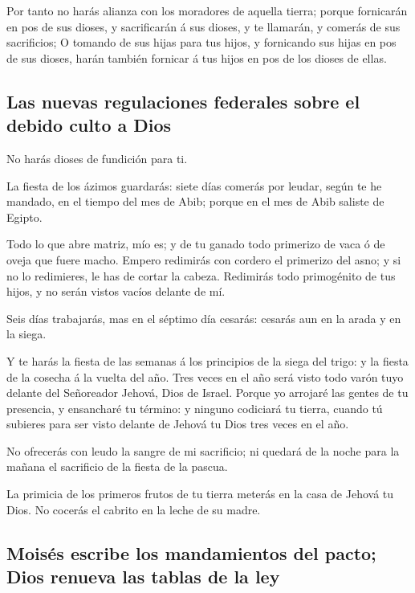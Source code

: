  Por tanto no harás alianza con los moradores de aquella
tierra; porque fornicarán en pos de sus dioses, y sacrificarán á sus
dioses, y te llamarán, y comerás de sus sacrificios;  O
tomando de sus hijas para tus hijos, y fornicando sus hijas en pos de
sus dioses, harán también fornicar á tus hijos en pos de los dioses de
ellas.

\hypertarget{las-nuevas-regulaciones-federales-sobre-el-debido-culto-a-dios}{%
\subsection{Las nuevas regulaciones federales sobre el debido culto a
Dios}\label{las-nuevas-regulaciones-federales-sobre-el-debido-culto-a-dios}}

 No harás dioses de fundición para ti.

 La fiesta de los ázimos guardarás: siete días comerás
por leudar, según te he mandado, en el tiempo del mes de Abib; porque en
el mes de Abib saliste de Egipto.

 Todo lo que abre matriz, mío es; y de tu ganado todo
primerizo de vaca ó de oveja que fuere macho.  Empero
redimirás con cordero el primerizo del asno; y si no lo redimieres, le
has de cortar la cabeza. Redimirás todo primogénito de tus hijos, y no
serán vistos vacíos delante de mí.

 Seis días trabajarás, mas en el séptimo día cesarás:
cesarás aun en la arada y en la siega.

 Y te harás la fiesta de las semanas á los principios de
la siega del trigo: y la fiesta de la cosecha á la vuelta del año.
 Tres veces en el año será visto todo varón tuyo delante
del Señoreador Jehová, Dios de Israel.  Porque yo
arrojaré las gentes de tu presencia, y ensancharé tu término: y ninguno
codiciará tu tierra, cuando tú subieres para ser visto delante de Jehová
tu Dios tres veces en el año.

 No ofrecerás con leudo la sangre de mi sacrificio; ni
quedará de la noche para la mañana el sacrificio de la fiesta de la
pascua.

 La primicia de los primeros frutos de tu tierra meterás
en la casa de Jehová tu Dios. No cocerás el cabrito en la leche de su
madre.

\hypertarget{moisuxe9s-escribe-los-mandamientos-del-pacto-dios-renueva-las-tablas-de-la-ley}{%
\subsection{Moisés escribe los mandamientos del pacto; Dios renueva las
tablas de la
ley}\label{moisuxe9s-escribe-los-mandamientos-del-pacto-dios-renueva-las-tablas-de-la-ley}}

